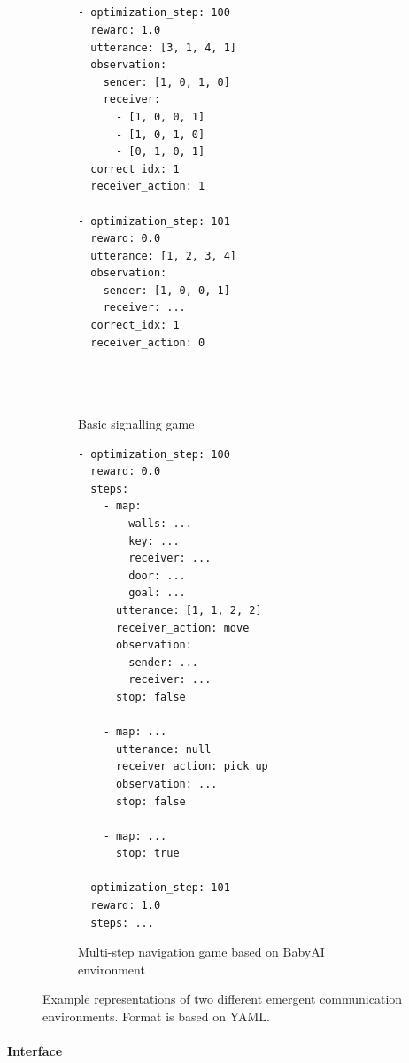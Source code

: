\begin{figure}
  \centering
  \begin{subfigure}[t]{0.4\linewidth}
    \centering
    \footnotesize
\begin{verbatim}




- optimization_step: 100
  reward: 1.0
  utterance: [3, 1, 4, 1]
  observation:
    sender: [1, 0, 1, 0]
    receiver:
      - [1, 0, 0, 1]
      - [1, 0, 1, 0]
      - [0, 1, 0, 1]
  correct_idx: 1
  receiver_action: 1

- optimization_step: 101
  reward: 0.0
  utterance: [1, 2, 3, 4]
  observation:
    sender: [1, 0, 0, 1]
    receiver: ...
  correct_idx: 1
  receiver_action: 0




\end{verbatim}
    \caption{Basic signalling game}
  \end{subfigure}
  \hfill
  \begin{subfigure}[t]{0.4\linewidth}
    \centering
    \footnotesize
\begin{verbatim}
- optimization_step: 100
  reward: 0.0
  steps:
    - map:
        walls: ...
        key: ...
        receiver: ...
        door: ...
        goal: ...
      utterance: [1, 1, 2, 2]
      receiver_action: move
      observation:
        sender: ...
        receiver: ...
      stop: false

    - map: ...
      utterance: null
      receiver_action: pick_up
      observation: ...
      stop: false

    - map: ...
      stop: true

- optimization_step: 101
  reward: 1.0
  steps: ...
\end{verbatim}
    \caption{Multi-step navigation game based on BabyAI environment}
  \end{subfigure}
  \caption{Example representations of two different emergent communication environments.  Format is based on YAML\@.}
  \unskip\label{fig:serialization}
\end{figure}


\paragraph{Interface}


